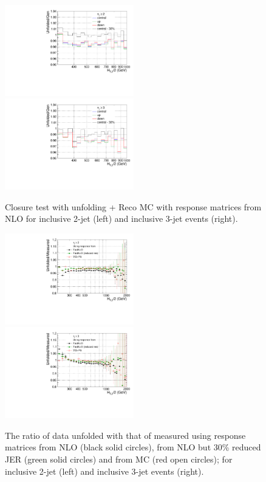 \begin{figure}[!htp]
  \begin{center}
    \includegraphics[width=0.5\textwidth]{Plots_HT_2_150/Comparison_closure_2_range.pdf}%
    \includegraphics[width=0.5\textwidth]{Plots_HT_2_150/Comparison_closure_3.pdf}
    \caption{Closure test with unfolding \MadGraphF + \PYTHIAS Reco MC with response matrices from NLO for inclusive 2-jet (left) and inclusive 3-jet events (right).}
    \label{fig:unfolded_reco_NLO}

    \includegraphics[width=0.5\textwidth]{Plots_HT_2_150/Ratio_Unfolding_data_NLO_2.pdf}%
    \includegraphics[width=0.5\textwidth]{Plots_HT_2_150/Ratio_Unfolding_data_NLO_3.pdf}
    \caption{The ratio of data unfolded with that of measured using response matrices from NLO (black solid circles), from NLO but 30\% reduced JER (green solid circles) and from MC (red open circles); for inclusive 2-jet (left) and inclusive 3-jet events (right).}
    \label{fig:unfolded_data}
  \end{center}
\end{figure}

